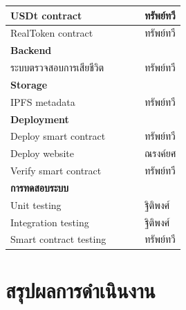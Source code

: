 \documentclass[12pt,oneside,openright,a4paper]{cpe-thai-project}
\begin{document}
\begin{table}[]
{\begin{tabular}{|lllll|}
\multicolumn{1}{|l|}{USDt contract} &
  \multicolumn{1}{l|}{\cellcolor[HTML]{25AE7A}} &
  \multicolumn{1}{l|}{} &
  \multicolumn{1}{l|}{} &
  ทรัพย์ทวี \\ \hline
\multicolumn{1}{|l|}{RealToken contract} &
  \multicolumn{1}{l|}{\cellcolor[HTML]{25AE7A}} &
  \multicolumn{1}{l|}{} &
  \multicolumn{1}{l|}{} &
  ทรัพย์ทวี \\ \hline
\multicolumn{5}{|l|}{\textbf{Backend}} \\ \hline
\multicolumn{1}{|l|}{ระบบตรวจสอบการเสียชีวิต} &
  \multicolumn{1}{l|}{} &
  \multicolumn{1}{l|}{} &
  \multicolumn{1}{l|}{\cellcolor[HTML]{C0C0C0}} &
  ทรัพย์ทวี \\ \hline
\multicolumn{5}{|l|}{\textbf{Storage}} \\ \hline
\multicolumn{1}{|l|}{IPFS metadata} &
  \multicolumn{1}{l|}{\cellcolor[HTML]{25AE7A}} &
  \multicolumn{1}{l|}{} &
  \multicolumn{1}{l|}{} &
  ทรัพย์ทวี \\ \hline
\multicolumn{5}{|l|}{\textbf{Deployment}} \\ \hline
\multicolumn{1}{|l|}{Deploy smart contract} &
  \multicolumn{1}{l|}{\cellcolor[HTML]{25AE7A}} &
  \multicolumn{1}{l|}{} &
  \multicolumn{1}{l|}{} &
  ทรัพย์ทวี \\ \hline
\multicolumn{1}{|l|}{Deploy website} &
  \multicolumn{1}{l|}{\cellcolor[HTML]{25AE7A}} &
  \multicolumn{1}{l|}{} &
  \multicolumn{1}{l|}{} &
  ณรงค์ยศ \\ \hline
\multicolumn{1}{|l|}{Verify smart contract} &
  \multicolumn{1}{l|}{\cellcolor[HTML]{25AE7A}} &
  \multicolumn{1}{l|}{} &
  \multicolumn{1}{l|}{} &
  ทรัพย์ทวี \\ \hline
\multicolumn{5}{|l|}{\textbf{การทดสอบระบบ}} \\ \hline
\multicolumn{1}{|l|}{Unit testing} &
  \multicolumn{1}{l|}{\cellcolor[HTML]{25AE7A}} &
  \multicolumn{1}{l|}{} &
  \multicolumn{1}{l|}{} &
  ฐิติพงศ์ \\ \hline
\multicolumn{1}{|l|}{Integration testing} &
  \multicolumn{1}{l|}{\cellcolor[HTML]{25AE7A}} &
  \multicolumn{1}{l|}{} &
  \multicolumn{1}{l|}{} &
  ฐิติพงศ์ \\ \hline
\multicolumn{1}{|l|}{Smart contract testing} &
  \multicolumn{1}{l|}{\cellcolor[HTML]{25AE7A}} &
  \multicolumn{1}{l|}{} &
  \multicolumn{1}{l|}{} &
  ทรัพย์ทวี \\ \hline
\end{tabular}%
}
\end{table}

\section{สรุปผลการดำเนินงาน}
\end{document}
